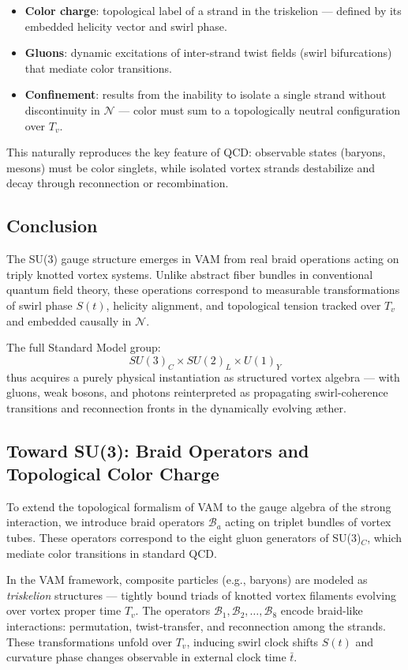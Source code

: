 \documentclass[12pt]{article}
\begin{document}
\begin{itemize}
    \item \textbf{Color charge}: topological label of a strand in the triskelion — defined by its embedded helicity vector and swirl phase.
    \item \textbf{Gluons}: dynamic excitations of inter-strand twist fields (swirl bifurcations) that mediate color transitions.
    \item \textbf{Confinement}: results from the inability to isolate a single strand without discontinuity in $\mathcal{N}$ — color must sum to a topologically neutral configuration over $T_v$.
\end{itemize}

This naturally reproduces the key feature of QCD: observable states (baryons, mesons) must be color singlets, while isolated vortex strands destabilize and decay through reconnection or recombination.

\subsection*{Conclusion}

The SU(3) gauge structure emerges in VAM from real braid operations acting on triply knotted vortex systems. Unlike abstract fiber bundles in conventional quantum field theory, these operations correspond to measurable transformations of swirl phase \( S(t) \), helicity alignment, and topological tension tracked over \( T_v \) and embedded causally in \( \mathcal{N} \).

The full Standard Model group:
\[
SU(3)_C \times SU(2)_L \times U(1)_Y
\]
thus acquires a purely physical instantiation as structured vortex algebra — with gluons, weak bosons, and photons reinterpreted as propagating swirl-coherence transitions and reconnection fronts in the dynamically evolving æther.

\subsection{Toward SU(3): Braid Operators and Topological Color Charge}

To extend the topological formalism of VAM to the gauge algebra of the strong interaction, we introduce braid operators \( \mathcal{B}_a \) acting on triplet bundles of vortex tubes. These operators correspond to the eight gluon generators of SU(3)\(_C\), which mediate color transitions in standard QCD.

In the VAM framework, composite particles (e.g., baryons) are modeled as \emph{triskelion} structures — tightly bound triads of knotted vortex filaments evolving over vortex proper time \( T_v \). The operators \( \mathcal{B}_1, \mathcal{B}_2, \dots, \mathcal{B}_8 \) encode braid-like interactions: permutation, twist-transfer, and reconnection among the strands. These transformations unfold over \( T_v \), inducing swirl clock shifts \( S(t) \) and curvature phase changes observable in external clock time \( \bar{t} \).
\end{document}
